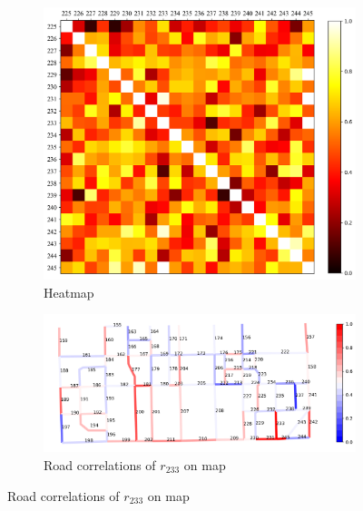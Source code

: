 \begin{figure}[htb]
    \centering
    \caption{Visualization of road correlations.}
    \label{fig: vis_road_cor}
    \begin{subfigure}[t]{0.33\linewidth}
        \centering
        \includegraphics[width=\textwidth]{images/heatmap.png}
        \caption{Heatmap}
        \label{fig: heatmap}
    \end{subfigure}
    \begin{subfigure}[t]{0.66\linewidth}
        \centering
        \includegraphics[width=\textwidth]{images/road_correlation.png}
        \caption{Road correlations of $r_{233}$ on map}
        \label{fig: road_correlation_map}
    \end{subfigure}
\end{figure}


